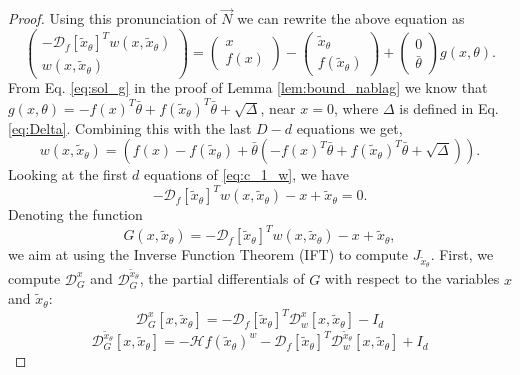 \documentclass[12pt]{article}
\theoremstyle{remark}
\newcommand{\DD}{\mathcal{D}}
\newcommand{\HH}{\mathcal{H}}
\newcommand{\wtilde}[1]{\widetilde{#1}}
\begin{document}
\begin{appendices}
\begin{proof}
Using this pronunciation of $\vec N$ we can rewrite the above equation as 
\begin{equation}\label{eq:c_1_w}
\left(\begin{array}{c}
     -\DD_f[\wtilde{x}_\theta]^T w(x,\wtilde x_\theta) \\
     w(x,\wtilde x_\theta)
\end{array}\right) = 
\left(\begin{array}{c}
     x \\
     f(x) 
\end{array}\right)
-
\left(\begin{array}{c}
     \wtilde{x}_\theta \\
     f(\wtilde{x}_\theta) 
\end{array}\right)
+ 
\left(\begin{array}{c}
     0 \\
     \bar \theta
\end{array}\right) g(x,\theta)
.\end{equation}
From Eq. \eqref{eq:sol_g} in the proof of Lemma \ref{lem:bound_nablag} we know that 
$g(x, \theta) = -f(x)^T\bar\theta + f(\wtilde x_\theta)^T\bar \theta + \sqrt{\Delta}$, near $x=0$, where $\Delta$ is defined in Eq. \eqref{eq:Delta}.
Combining this with the last $D-d$ equations  we get,
\begin{equation}\label{eq:def_w}
    w(x,\wtilde x_\theta) =\left(f(x) - f(\wtilde{x}_\theta) + \bar \theta \left(- f(x)^T \bar \theta + f(\wtilde{x}_\theta) ^T \bar \theta + 
    \sqrt{\Delta}\right)\right)
.\end{equation}
Looking at the first $d$ equations of \eqref{eq:c_1_w}, we have 
\[
-\DD_f[\wtilde{x}_\theta]^T w(x,\wtilde x_\theta) - x + \wtilde{x}_\theta = 0
.\]
Denoting the function 
\begin{equation} \label{eq:G_def}
G(x,\wtilde{x}_\theta) = -\DD_f[\wtilde{x}_\theta]^T w(x,\wtilde x_\theta) - x + \wtilde{x}_\theta    
,\end{equation}
we aim at using the Inverse Function Theorem (IFT) to compute $J_{\wtilde{x}_\theta}$.
First, we compute  $\DD^{x}_G $ and $\DD^{\wtilde{x}_\theta}_G$, the partial differentials of $G$ with respect to the variables $x$ and $\wtilde x_\theta$:
\begin{equation*}
    \DD^x_G[x, \wtilde x_\theta] = - \DD_f[\wtilde{x}_\theta]^T \DD^x_w[x, \wtilde x_\theta] - I_d
\end{equation*}
\begin{equation*}
    \DD^{\wtilde{x}_\theta}_G[x, \wtilde x_\theta] = - \HH f(\wtilde x_\theta)^w - \DD_f[\wtilde{x}_\theta]^T \DD^{\wtilde{x}_\theta}_w[x, \wtilde x_\theta]  + I_d

\end{equation*}
\end{proof}
\end{appendices}
\end{document}
